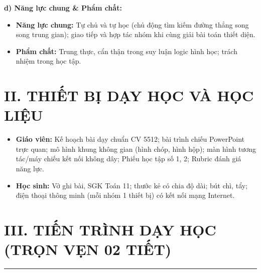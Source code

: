 \documentclass[12pt, a4paper]{article}
\begin{document}
\textbf{d) Năng lực chung \& Phẩm chất:}
\begin{itemize}[leftmargin=1.5em]
    \item \textbf{Năng lực chung:} Tự chủ và tự học (chủ động tìm kiếm đường thẳng song song trung gian); giao tiếp và hợp tác nhóm khi cùng giải bài toán thiết diện.
    \item \textbf{Phẩm chất:} Trung thực, cẩn thận trong suy luận logic hình học; trách nhiệm trong học tập.
\end{itemize}

\section*{II. THIẾT BỊ DẠY HỌC VÀ HỌC LIỆU}
\begin{itemize}[leftmargin=1.5em]
    \item \textbf{Giáo viên:} Kế hoạch bài dạy chuẩn CV 5512; bài trình chiếu PowerPoint trực quan; mô hình khung không gian (hình chóp, hình hộp); màn hình tương tác/máy chiếu kết nối không dây; Phiếu học tập số 1, 2; Rubric đánh giá năng lực.
    \item \textbf{Học sinh:} Vở ghi bài, SGK Toán 11; thước kẻ có chia độ dài; bút chì, tẩy; điện thoại thông minh (mỗi nhóm 1 thiết bị) có kết nối mạng Internet.
\end{itemize}

\section*{III. TIẾN TRÌNH DẠY HỌC (TRỌN VẸN 02 TIẾT)}

\begin{center}
\end{center}

\vspace{0.8em}
\hrule
\vspace{0.8em}
\end{document}
